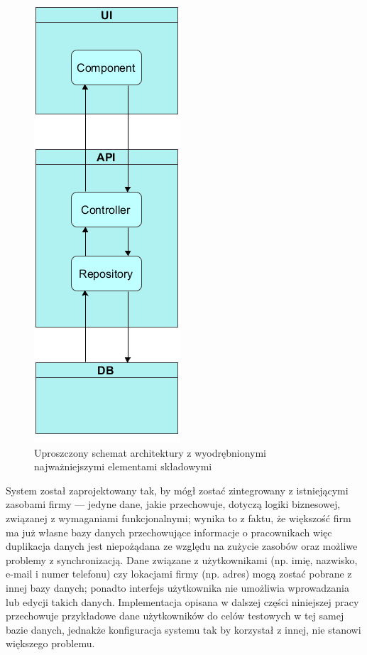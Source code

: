 \documentclass[eng,printmode,openany]{mgr}
\begin{document}
	\begin{figure}[h]
		\centering
		\includegraphics[scale=0.6]{images/architecture.png}
		\caption{Uproszczony schemat architektury z wyodrębnionymi najważniejszymi elementami składowymi}
	\end{figure}
	
	
	System został zaprojektowany tak, by mógł zostać zintegrowany z istniejącymi zasobami firmy — jedyne dane, jakie przechowuje, dotyczą logiki biznesowej, związanej z wymaganiami funkcjonalnymi; wynika to z faktu, że większość firm ma już własne bazy danych przechowujące informacje o pracownikach więc duplikacja danych jest niepożądana ze względu na zużycie zasobów oraz możliwe problemy z synchronizacją. Dane związane z użytkownikami (np. imię, nazwisko, e-mail i numer telefonu) czy lokacjami firmy (np. adres) mogą zostać pobrane z innej bazy danych; ponadto interfejs użytkownika nie umożliwia wprowadzania lub edycji takich danych. Implementacja opisana w dalszej części niniejszej pracy przechowuje przykładowe dane użytkowników do celów testowych w tej samej bazie danych, jednakże konfiguracja systemu tak by korzystał z innej, nie stanowi większego problemu.
	
\end{document}
